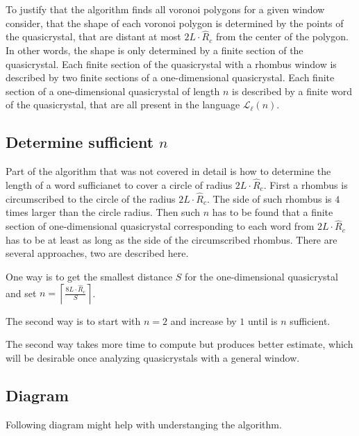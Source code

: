 \documentclass[text.tex]{subfiles}
\begin{document}
To justify that the algorithm finds all voronoi polygons for a given window consider, that the shape of each voronoi polygon is determined by the points of the quasicrystal, that are distant at most $2L\cdot\hat{R}_c$ from the center of the polygon. In other words, the shape is only determined by a finite section of the quasicrystal. Each finite section of the quasicrystal with a rhombus window is described by two finite sections of a one-dimensional quasicrystal. Each finite section of a one-dimensional quasicrystal of length $n$ is described by a finite word of the quasicrystal, that are all present in the language $\mathcal{L}_{\ell}(n)$.

\subsection{Determine sufficient $n$}
Part of the algorithm that was not covered in detail is how to determine the length of a word sufficianet to cover a circle of radius $2L\cdot\hat{R}_c$. First a rhombus is circumscribed to the circle of the radius $2L\cdot\hat{R}_c$. The side of such rhombus is $4$ times larger than the circle radius. Then such $n$ has to be found that a finite section of one-dimensional quasicrystal corresponding to each word from $2L\cdot\hat{R}_c$ has to be at least as long as the side of the circumscribed rhombus. 
There are several approaches, two are described here. 

One way is to get the smallest distance $S$ for the one-dimensional quasicrystal and set $n = \left\lceil\frac{8L\cdot\hat{R}_c}{S}\right\rceil$. 

The second way is to start with $n=2$ and increase by $1$ until is $n$ sufficient. 

The second way takes more time to compute but produces better estimate, which will be desirable once analyzing quasicrystals with a general window.

\subsection{Diagram}
Following diagram might help with understanging the algorithm.
\end{document}

